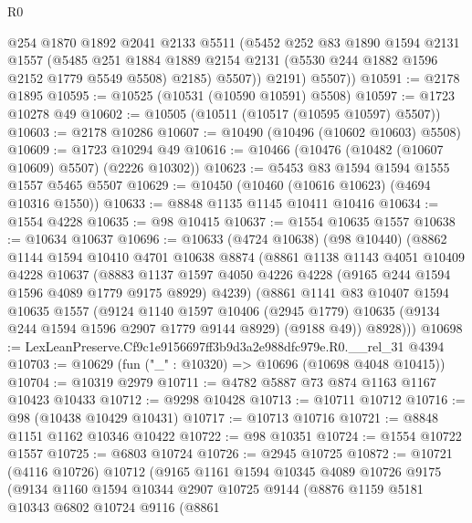 \begin{lexlean}{R0}
\begin{coremodule}
            @254
            @1870
            @1892
            @2041
            @2133
            @5511
            (@5452
              @252
              @83
              @1890
              @1594
              @2131
              @1557
              (@5485
                @251
                @1884
                @1889
                @2154
                @2131
                (@5530 @244 @1882 @1596 @2152 @1779 @5549 @5508)
                @2185)
              @5507))
          @2191)
        @5507))
@10591 := @2178 @1895
@10595 := @10525 (@10531 (@10590 @10591) @5508)
@10597 := @1723 @10278 @49
@10602 := @10505 (@10511 (@10517 (@10595 @10597) @5507))
@10603 := @2178 @10286
@10607 := @10490 (@10496 (@10602 @10603) @5508)
@10609 := @1723 @10294 @49
@10616 := @10466 (@10476 (@10482 (@10607 @10609) @5507) (@2226 @10302))
@10623 := @5453 @83 @1594 @1594 @1555 @1557 @5465 @5507
@10629 := @10450 (@10460 (@10616 @10623) (@4694 @10316 @1550))
@10633 := @8848 @1135 @1145 @10411 @10416
@10634 := @1554 @4228
@10635 := @98 @10415
@10637 := @1554 @10635 @1557
@10638 := @10634 @10637
@10696 := @10633
    (@4724 @10638)
    (@98 @10440)
    (@8862
      @1144
      @1594
      @10410
      @4701
      @10638
      @8874
      (@8861
        @1138
        @1143
        @4051
        @10409
        @4228
        @10637
        (@8883 @1137 @1597 @4050 @4226 @4228 (@9165 @244 @1594 @1596 @4089 @1779 @9175 @8929) @4239)
        (@8861
          @1141
          @83
          @10407
          @1594
          @10635
          @1557
          (@9124
            @1140
            @1597
            @10406
            (@2945 @1779)
            @10635
            (@9134 @244 @1594 @1596 @2907 @1779 @9144 @8929)
            (@9188 @49))
          @8928)))
@10698 := LexLeanPreserve.Cf9c1e9156697ff3b9d3a2e988dfc979e.R0.__rel_31 @4394
@10703 := @10629 (fun ("_" : @10320) => @10696 (@10698 @4048 @10415))
@10704 := @10319 @2979
@10711 := @4782 @5887 @73 @874 @1163 @1167 @10423 @10433
@10712 := @9298 @10428
@10713 := @10711 @10712
@10716 := @98 (@10438 @10429 @10431)
@10717 := @10713 @10716
@10721 := @8848 @1151 @1162 @10346 @10422
@10722 := @98 @10351
@10724 := @1554 @10722 @1557
@10725 := @6803 @10724
@10726 := @2945 @10725
@10872 := @10721
    (@4116 @10726)
    @10712
    (@9165
      @1161
      @1594
      @10345
      @4089
      @10726
      @9175
      (@9134
        @1160
        @1594
        @10344
        @2907
        @10725
        @9144
        (@8876
          @1159
          @5181
          @10343
          @6802
          @10724
          @9116
          (@8861

\end{coremodule}
\end{lexlean}
